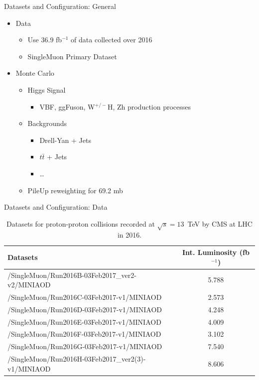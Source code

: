 \documentclass[pdf, 9pt]{beamer}
\begin{document}
  \begin{frame}{Datasets and Configuration: General}
    \begin{itemize}
      \item Data
        \begin{itemize}
          \item Use $36.9$ fb$^{-1}$ of data collected over 2016
          \item SingleMuon Primary Dataset
        \end{itemize}
      \item Monte Carlo
        \begin{itemize}
          \item Higgs Signal
            \begin{itemize}
              \item VBF, ggFuson, W$^{+/-}$H, Zh production processes
            \end{itemize}
          \item Backgrounds
            \begin{itemize}
              \item Drell-Yan + Jets
              \item $t\bar{t}$ + Jets
              \item \dots
            \end{itemize}
          \item PileUp reweighting for 69.2 mb
        \end{itemize}
    \end{itemize}
  \end{frame}

  \begin{frame}{Datasets and Configuration: Data}
    \begin{table}[htb]
    \caption{Datasets for proton-proton collisions recorded at $\sqrt{s}=13$~TeV by CMS at LHC in 2016.}
    \label{table:higgs_data_collisiondatasets}
    \begin{center}
        \begin{tabular}{ l  c}
            \hline
            Datasets & Int. Luminosity (fb$^{-1}$)\\
            \hline
            {/SingleMuon/Run2016B-03Feb2017\_ver2-v2/MINIAOD} & 5.788\\
            {/SingleMuon/Run2016C-03Feb2017-v1/MINIAOD} & 2.573\\
            {/SingleMuon/Run2016D-03Feb2017-v1/MINIAOD} & 4.248\\
            {/SingleMuon/Run2016E-03Feb2017-v1/MINIAOD} & 4.009\\
            {/SingleMuon/Run2016F-03Feb2017-v1/MINIAOD} & 3.102\\
            {/SingleMuon/Run2016G-03Feb2017-v1/MINIAOD} & 7.540\\
            {/SingleMuon/Run2016H-03Feb2017\_ver2(3)-v1/MINIAOD} & 8.606\\
            \hline
        \end{tabular}
    \end{center}
    \end{table}
  \end{frame}
\end{document}
